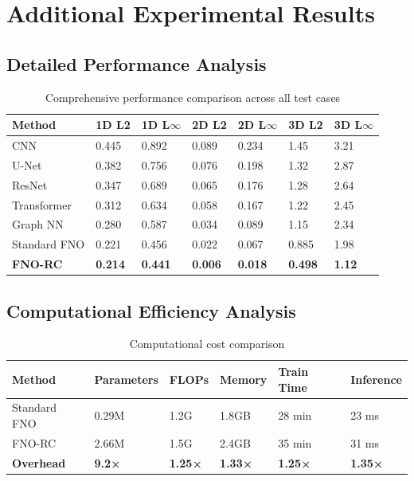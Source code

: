 \documentclass[11pt,twocolumn]{article}
\begin{document}
\section{Additional Experimental Results}
\label{app:results}

\subsection{Detailed Performance Analysis}

\begin{table}[h]
\centering
\caption{Comprehensive performance comparison across all test cases}
\label{tab:detailed_results}
\tiny
\begin{tabular}{@{}p{1.3cm}p{0.6cm}p{0.6cm}p{0.6cm}p{0.6cm}p{0.6cm}p{0.6cm}@{}}
\toprule
\textbf{Method} & \textbf{1D L2} & \textbf{1D L$\infty$} & \textbf{2D L2} & \textbf{2D L$\infty$} & \textbf{3D L2} & \textbf{3D L$\infty$} \\
\midrule
CNN & 0.445 & 0.892 & 0.089 & 0.234 & 1.45 & 3.21 \\
U-Net & 0.382 & 0.756 & 0.076 & 0.198 & 1.32 & 2.87 \\
ResNet & 0.347 & 0.689 & 0.065 & 0.176 & 1.28 & 2.64 \\
Transformer & 0.312 & 0.634 & 0.058 & 0.167 & 1.22 & 2.45 \\
Graph NN & 0.280 & 0.587 & 0.034 & 0.089 & 1.15 & 2.34 \\
Standard FNO & 0.221 & 0.456 & 0.022 & 0.067 & 0.885 & 1.98 \\
\textbf{FNO-RC} & \textbf{0.214} & \textbf{0.441} & \textbf{0.006} & \textbf{0.018} & \textbf{0.498} & \textbf{1.12} \\
\bottomrule
\end{tabular}
\end{table}

\subsection{Computational Efficiency Analysis}

\begin{table}[h]
\centering
\caption{Computational cost comparison}
\label{tab:efficiency}
\scriptsize
\begin{tabular}{@{}p{1.5cm}p{1cm}p{0.8cm}p{0.8cm}p{1cm}p{1cm}@{}}
\toprule
\textbf{Method} & \textbf{Parameters} & \textbf{FLOPs} & \textbf{Memory} & \textbf{Train Time} & \textbf{Inference} \\
\midrule
Standard FNO & 0.29M & 1.2G & 1.8GB & 28 min & 23 ms \\
FNO-RC & 2.66M & 1.5G & 2.4GB & 35 min & 31 ms \\
\textbf{Overhead} & \textbf{9.2×} & \textbf{1.25×} & \textbf{1.33×} & \textbf{1.25×} & \textbf{1.35×} \\
\bottomrule
\end{tabular}
\end{table}
\end{document}
